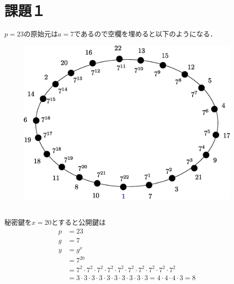 \documentclass[a4paper,12pt]{jarticle}
\begin{document}
%
\title{\vspace{-30mm} }
\date{}
%
\maketitle
%
\vspace{-30mm}
%
\setlength{\abovedisplayskip}{0pt} %
\setlength{\belowdisplayskip}{0pt} %

\section*{課題１}
\vspace{-4mm}
$p=23$の原始元は$a=7$であるので空欄を埋めると以下のようになる．
%
\begin{figure}[hbp]
 \begin{center}
  \includegraphics[width=120mm]{fig/elga.eps}
 \end{center}
 \label{fig:elga}
\end{figure}
%
\\秘密鍵を$x=20$とすると公開鍵は
%
\begin{align}
 p&=23 \\
 g&=7 \\
 y&=g^x \nonumber\\
 &=7^{20}\nonumber\\
 &=7^2\cdot7^2\cdot7^2\cdot7^2\cdot7^2\cdot7^2\cdot7^2\cdot7^2\cdot7^2\cdot7^2 \nonumber\\
  &=3\cdot3\cdot3\cdot3\cdot3\cdot3\cdot3\cdot3\cdot3\cdot3=4\cdot4\cdot4\cdot3=8
\end{align}
\end{document}
